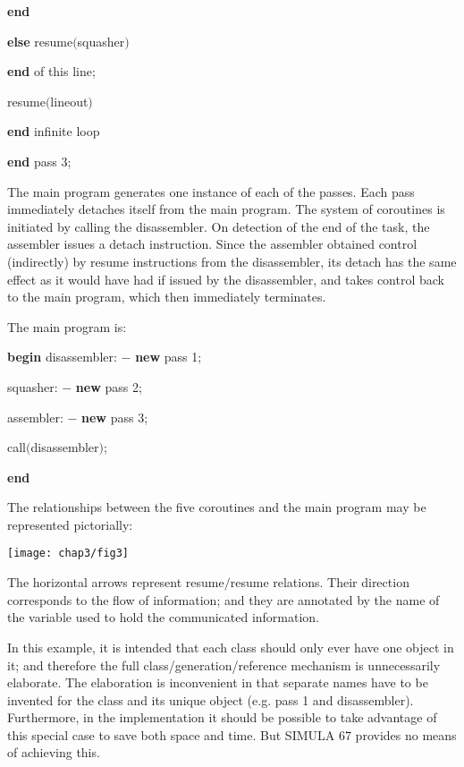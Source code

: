 \quad \quad \quad \quad \quad \quad \textbf{end}

\quad \quad \quad \quad \quad \quad \textbf{else} resume$($squasher$)$

\quad \quad \quad \quad \quad \quad \textbf{end} of this line;

\quad \quad \quad \quad resume$($lineout$)$

\quad \quad \quad \textbf{end} infinite loop

\quad \textbf{end} pass 3;

The main program generates one instance of each of the passes. Each pass immediately detaches itself from the main program. The system of coroutines is initiated by calling the disassembler. On detection of the end of the task, the assembler issues a detach instruction. Since the assembler obtained control (indirectly) by resume instructions from the disassembler, its detach has the same effect as it would have had if issued by the disassembler, and takes control back to the main program, which then immediately terminates.

The main program is:

\quad \textbf{begin} disassembler: $-$ \textbf{new} pass 1;

\quad \quad squasher: $-$ \textbf{new} pass 2;

\quad \quad assembler: $-$ \textbf{new} pass 3;

\quad \quad call$($disassembler$)$;

\quad \textbf{end}

The relationships between the five coroutines and the main program may be represented pictorially:
\begin{center}
	\texttt{[image: chap3/fig3]}
\end{center}

\noindent
The horizontal arrows represent resume$/$resume relations. Their direction corresponds to the flow of information; and they are annotated by the name of the variable used to hold the communicated information.

In this example, it is intended that each class should only ever have one object in it; and therefore the full class/generation/reference mechanism is unnecessarily elaborate. The elaboration is inconvenient in that separate names have to be invented for the class and its unique object (e.g. pass 1 and disassembler). Furthermore, in the implementation it should be possible to take advantage of this special case to save both space and time. But SIMULA 67 provides no means of achieving this.

